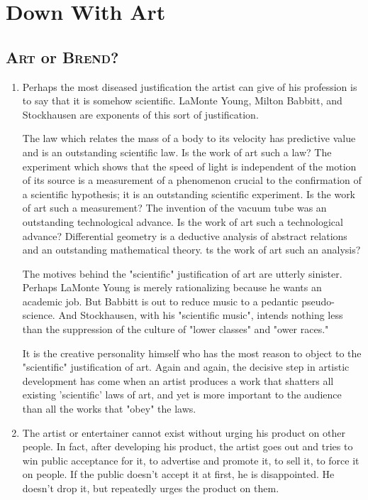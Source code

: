 \documentclass[10pt,twoside,draft]{memoir}
\begin{document}
{\chapter{Down With Art}

\section{\textsc{Art} or \textsc{Brend}?}

\begin{enumerate}
\item Perhaps the most diseased justification the artist can give of his profession 
is to say that it is somehow scientific. LaMonte Young, Milton Babbitt, and 
Stockhausen are exponents of this sort of justification. 

The law which relates the mass of a body to its velocity has predictive value 
and is an outstanding scientific law. Is the work of art such a law? The 
experiment which shows that the speed of light is independent of the motion 
of its source is a measurement of a phenomenon crucial to the confirmation of 
a scientific hypothesis; it is an outstanding scientific experiment. Is the work 
of art such a measurement? The invention of the vacuum tube was an 
outstanding technological advance. Is the work of art such a technological 
advance? Differential geometry is a deductive analysis of abstract relations 
and an outstanding mathematical theory. ts the work of art such an 
analysis? 

The motives behind the "scientific" justification of art are utterly sinister. 
Perhaps LaMonte Young is merely rationalizing because he wants an 
academic job. But Babbitt is out to reduce music to a pedantic 
pseudo-science. And Stockhausen, with his "scientific music", intends 
nothing less than the suppression of the culture of "lower classes" and 
"ower races." 

It is the creative personality himself who has the most reason to object to 
the "scientific" justification of art. Again and again, the decisive step in 
artistic development has come when an artist produces a work that shatters 
all existing 'scientific' laws of art, and yet is more important to the 
audience than all the works that "obey" the laws. 

\item The artist or entertainer cannot exist without urging his product on other 
people. In fact, after developing his product, the artist goes out and tries to 
win public acceptance for it, to advertise and promote it, to sell it, to force it 
on people. If the public doesn't accept it at first, he is disappointed. He 
doesn't drop it, but repeatedly urges the product on them. 


\end{enumerate}}
\end{document}
